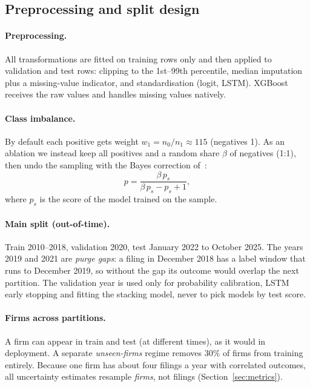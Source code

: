 \subsection{Preprocessing and split design}
\label{sec:split}

\paragraph{Preprocessing.} All transformations are fitted on training rows only and then applied to
validation and test rows: clipping to the 1st--99th percentile, median imputation plus a missing-value
indicator, and standardisation (logit, LSTM). XGBoost receives the raw values and handles missing values natively.

\paragraph{Class imbalance.} By default each positive gets weight $w_1 = n_0/n_1 \approx 115$ (negatives 1).
As an ablation we instead keep all positives and a random share $\beta$ of negatives (1:1), then undo the
sampling with the Bayes correction of~\cite{moscatelli2020}:
\begin{equation}
  p = \frac{\beta\, p_s}{\beta\, p_s - p_s + 1},
  \label{eq:bayes}
\end{equation}
where $p_s$ is the score of the model trained on the sample.

\paragraph{Main split (out-of-time).} Train 2010--2018, validation 2020, test January 2022 to October 2025.
The years 2019 and 2021 are \emph{purge gaps}: a filing in December 2018 has a label window that runs to
December 2019, so without the gap its outcome would overlap the next partition. The validation year is
used only for probability calibration, LSTM early stopping and fitting the stacking model, never to pick
models by test score.

\paragraph{Firms across partitions.} A firm can appear in train and test (at different times), as it would
in deployment. A separate \emph{unseen-firms} regime removes 30\% of firms from training entirely.
Because one firm has about four filings a year with correlated outcomes, all uncertainty estimates resample
\emph{firms}, not filings (Section~\ref{sec:metrics}).

